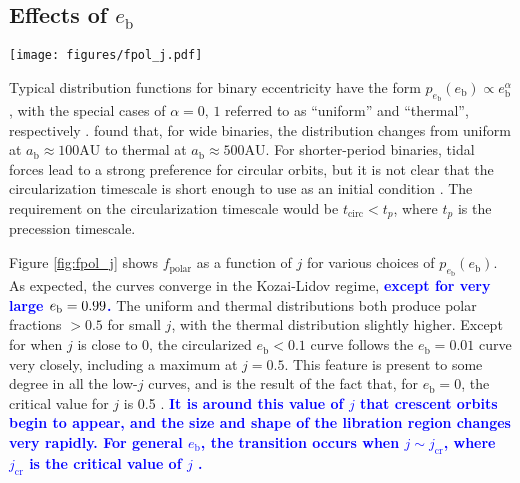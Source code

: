 \documentclass[twocolumn,linenumbers]{aastex631}
\newcommand{\RR}[1]{\textcolor{blue}{\bf#1}} %
\newcommand{\RP}[1]{\RR{#1}} %
\begin{document}
\subsection{Effects of $e_\text{b}$}
\label{subsec:effect-eb}

\begin{figure*}
    \centering
    \texttt{[image: figures/fpol\_j.pdf]}
    \caption{
        Polar disk fraction $f_\text{polar}$ as a function of $j$ for various distributions $p_{e_\text{b}}(e_\text{b})$. All cases assume isotropic distributions of initial angular momentum. In the thermal case, $p_{e_\text{b}}(e_\text{b}) \propto e_\text{b}$. In the uniform case, $p_{e_\text{b}}(e_\text{b}) = \text{const}$. The case labeled $e_\text{b} < 0.1$ uses a uniform distribution, but restricts the domain to $e_\text{b} \in [0,0.1)$. These three distributions are shown in the inset. The dashed line cases fix $e_\text{b}$ at a particular value. Notice the maximum that occurs at $j\approx 0.5$. This occurs because the appearance of crescent orbits at $j=j_\text{cr}$ \citep[eq. A3]{martin2019} make the parameter space that eventually evolves to polar very large.
    }
    \label{fig:fpol_j}
\end{figure*}

Typical distribution functions for binary eccentricity have the form $p_{e_\text{b}}(e_\text{b}) \propto e_\text{b}^\alpha$, with the special cases of $\alpha=0,\,1$ referred to as ``uniform'' and ``thermal'', respectively \citep[see also \citealt{ceppi2024}]{hwang2022}. \citet{hwang2022} found that, for wide binaries, the distribution changes from uniform at $a_\text{b}\approx 100\text{AU}$ to thermal at $a_\text{b}\approx 500\text{AU}$. For shorter-period binaries, tidal forces lead to a strong preference for circular orbits, but it is not clear that the circularization timescale is short enough to use as an initial condition \citep[e.g.,][]{meibom2005,geller2012}. The requirement on the circularization timescale would be $t_\text{circ} < t_p$, where $t_p$ is the precession timescale.

Figure \ref{fig:fpol_j} shows $f_\text{polar}$ as a function of $j$ for various choices of $p_{e_\text{b}}(e_\text{b})$. As expected, the curves converge in the Kozai-Lidov regime, \RR{except for very large $e_{\rm b}=0.99$.} The uniform and thermal distributions both produce polar fractions $>0.5$ for small $j$, with the thermal distribution slightly higher. Except for when $j$ is close to 0, the circularized $e_\text{b} < 0.1$ curve follows the $e_\text{b} = 0.01$ curve very closely, including a maximum at $j=0.5$. This feature is present to some degree in all the low-$j$ curves, and is the result of the fact that, for $e_\text{b}=0$, the critical value for $j$ is 0.5 \citep{abod2022}. \RP{It is around this value of $j$ that crescent orbits begin to appear, and the size and shape of the libration region changes very rapidly. For general $e_\text{b}$, the transition occurs when $j\sim j_\text{cr}$, where $j_\text{cr}$ is the critical value of $j$ \citep[eq. A3]{martin2019}.}
\end{document}
